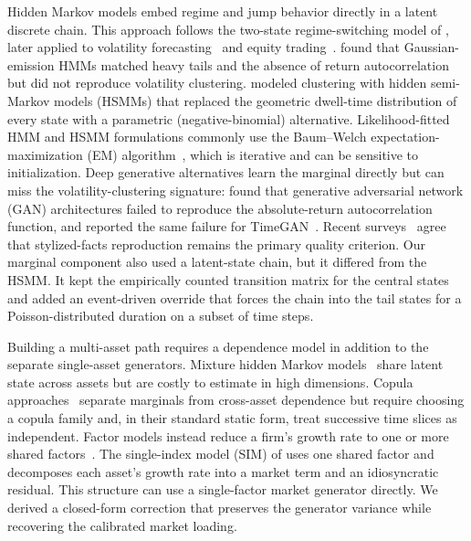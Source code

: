 Hidden Markov models embed regime and jump behavior directly in a
latent discrete chain. This approach follows the two-state
regime-switching model of \citet{hamilton1989}, later applied to
volatility forecasting~\cite{rossiGallo2006} and equity
trading~\cite{nguyen2018}. \citet{rydenTerasvirtaAsbrink1998} found that Gaussian-emission
HMMs matched heavy tails and the absence of return autocorrelation
but did not reproduce volatility clustering. \citet{bullaBulla2006}
modeled clustering with hidden
semi-Markov models (HSMMs) that replaced the geometric dwell-time
distribution of every state with a parametric (negative-binomial)
alternative. Likelihood-fitted HMM and HSMM formulations commonly use
the Baum--Welch expectation-maximization (EM)
algorithm~\cite{baumPetrieSoulesWeiss1970}, which is iterative and can
be sensitive to initialization. Deep generative alternatives learn the
marginal directly but can miss the
volatility-clustering signature: \citet{takahashiEtAl2019} found that
generative adversarial
network (GAN) architectures failed to reproduce the absolute-return
autocorrelation function, and \citet{kwonLee2024}
reported the same failure for TimeGAN~\cite{yoonEtAl2019timegan}. Recent
surveys~\cite{assefaEtAl2020, jordonEtAl2022, stengerEtAl2024} agree
that stylized-facts reproduction remains the primary quality
criterion. Our marginal component also used a latent-state chain, but
it differed from the HSMM. It kept the empirically counted transition
matrix for the central states and added an event-driven
override that forces the chain into the tail states for a
Poisson-distributed duration on a subset of time steps.

Building a multi-asset path requires a dependence model in addition
to the separate single-asset generators. Mixture hidden Markov
models~\cite{diasVermuntRamos2010} share latent state across assets
but are costly to estimate in high dimensions. Copula
approaches~\cite{embrechtsMcNeilStraumann2002,
cherubiniLucianoVecchiato2004, aasCzadoFrigessiBakken2009} separate
marginals from cross-asset dependence but require choosing a copula
family and, in their standard static form, treat successive time
slices as independent. Factor models instead reduce a firm's growth
rate to one or more shared factors~\cite{rossAPT1976,
famaFrench1993}. The single-index model (SIM) of
\citet{sharpe1963} uses one shared factor and decomposes each
asset's growth rate into a market term and an idiosyncratic residual.
This structure can use a single-factor market generator directly. We
derived a closed-form correction that preserves the generator
variance while recovering the calibrated market loading.

